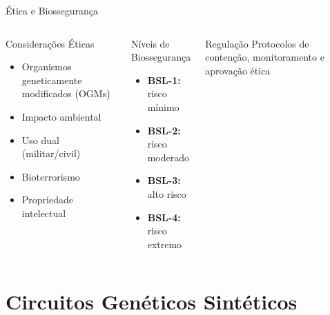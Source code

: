 \begin{frame}{Ética e Biossegurança}
\begin{columns}
\begin{alertblock}{Considerações Éticas}
\begin{itemize}
    \item Organismos geneticamente modificados (OGMs)
    \item Impacto ambiental
    \item Uso dual (militar/civil)
    \item Bioterrorismo
    \item Propriedade intelectual
\end{itemize}
\end{alertblock}

\begin{block}{Níveis de Biossegurança}
\begin{itemize}
    \item \textbf{BSL-1:} risco mínimo
    \item \textbf{BSL-2:} risco moderado
    \item \textbf{BSL-3:} alto risco
    \item \textbf{BSL-4:} risco extremo
\end{itemize}
\end{block}

\begin{exampleblock}{Regulação}
Protocolos de contenção, monitoramento e aprovação ética
\end{exampleblock}
\end{columns}
\end{frame}

\section{Circuitos Genéticos Sintéticos}

